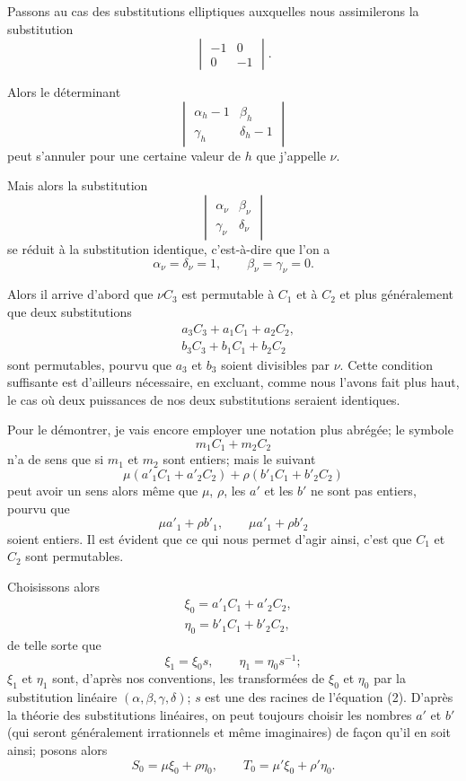 \documentclass{article}
\begin{document}
Passons au cas des substitutions elliptiques auxquelles nous assimilerons la substitution
\[ \begin{vmatrix} -1 & 0 \\[1ex] 0 & -1 \end{vmatrix}. \]

Alors le déterminant
\[ \begin{vmatrix} \alpha_{h} - 1 & \beta_{h} \\[1ex] \gamma_{h} & \delta_{h} - 1 \end{vmatrix} \]
peut s'annuler pour une certaine valeur de $h$ que j'appelle $\nu$.

Mais alors la substitution
\[ \begin{vmatrix} \alpha_{\nu} & \beta_{\nu} \\[1ex] \gamma_{\nu} & \delta_{\nu} \end{vmatrix} \]
se réduit à la substitution identique, c'est-à-dire que l'on a
\[ \alpha_{\nu} = \delta_{\nu} = 1, \qquad \beta_{\nu} = \gamma_{\nu} = 0. \]

Alors il arrive d'abord que $\nu C_{3}$ est permutable à $C_{1}$ et à $C_{2}$ et plus généralement que deux substitutions
\[ \begin{aligned} &a_{3}C_{3} + a_{1}C_{1} + a_{2}C_{2},\\ &b_{3}C_{3} + b_{1}C_{1} + b_{2}C_{2} \end{aligned} \]
sont permutables, pourvu que $a_{3}$ et $b_{3}$ soient divisibles par $\nu$. Cette condition suffisante est d'ailleurs nécessaire, en excluant, comme nous l'avons fait plus haut, le cas où deux puissances de nos deux substitutions seraient identiques.

Pour le démontrer, je vais encore employer une notation plus abrégée; le symbole
\[ m_{1}C_{1} + m_{2}C_{2} \]
n'a de sens que si $m_{1}$ et $m_{2}$ sont entiers; mais le suivant
\[ \mu(a'_{1}C_{1} + a'_{2}C_{2}) + \rho(b'_{1}C_{1} + b'_{2}C_{2}) \]
peut avoir un sens alors même que $\mu$, $\rho$, les $a'$ et les $b'$ ne sont pas entiers, pourvu que
\[ \mu a'_{1} + \rho b'_{1}, \qquad \mu a'_{1} + \rho b'_{2} \]
soient entiers. Il est évident que ce qui nous permet d'agir ainsi, c'est que $C_{1}$ et $C_{2}$ sont permutables.

Choisissons alors
\[ \begin{aligned} &\xi_{0} = a'_{1}C_{1} + a'_{2}C_{2},\\ &\eta_{0} = b'_{1}C_{1} + b'_{2}C_{2}, \end{aligned} \]
de telle sorte que
\[ \xi_{1} = \xi_{0}s, \qquad \eta_{1} = \eta_{0}s^{-1}; \]
$\xi_{1}$ et $\eta_{1}$ sont, d'après nos conventions, les transformées de $\xi_{0}$ et $\eta_{0}$ par la substitution linéaire $(\alpha, \beta, \gamma, \delta)$; $s$ est une des racines de l'équation (2). D'après la théorie des substitutions linéaires, on peut toujours choisir les nombres $a'$ et $b'$ (qui seront généralement irrationnels et même imaginaires) de façon qu'il en soit ainsi; posons alors
\[ S_{0} = \mu\xi_{0} + \rho\eta_{0}, \qquad T_{0} = \mu'\xi_{0} + \rho'\eta_{0}. \]
\end{document}

